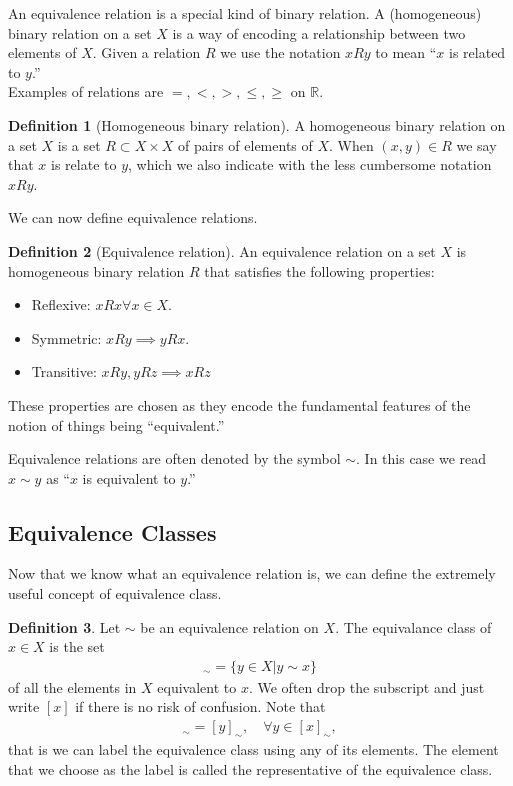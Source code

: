 \documentclass{book}
\theoremstyle{definition}
\newtheorem{defn}{Definition}[section]
\begin{document}
An equivalence relation is a special kind of binary relation. A
(homogeneous) binary relation on a set $X$ is a way of encoding a relationship between two elements of $X$. Given a relation $R$ we use the notation $xRy$ to mean ``$x$ is related to $y$.'' \\

Examples of relations are $=,<,>, \leq, \geq$ on $\mathbb{R}$. \\

\begin{defn}[Homogeneous binary relation]
	A homogeneous binary relation on a set $X$ is a set $R \subset X \times X$ of pairs of
	elements of $X$. When $(x,y) \in R$ we say that $x$ is relate to $y$, which we also indicate with the less cumbersome notation $xRy$.  
\end{defn}

We can now define equivalence relations.



\begin{defn}[Equivalence relation]
	An equivalence relation on a set $X$ is homogeneous binary relation $R$ that satisfies the following properties:
	\begin{itemize}
		\item Reflexive: $xRx \forall x\in X$.
		\item Symmetric: $xRy \implies yRx$.
		\item Transitive: $xRy, yRz \implies xRz$
	\end{itemize}
	These properties are chosen as they encode the fundamental features of the notion of
	things being ``equivalent.''
\end{defn}

Equivalence relations are often denoted by the symbol $\sim$. In this case we read $x\sim y$ as ``$x$ is equivalent to $y$.'' 





\subsection{Equivalence Classes}

Now that we know what an equivalence relation is, we can define the extremely useful concept of equivalence class.


\begin{defn}
	Let $\sim$ be an equivalence relation on $X$. The equivalance class of $x \in X$ is the set 
	\begin{align}
	[x]_\sim = \{ y\in X \vert y\sim x   \}
	\end{align}
	of all the elements in $X$ equivalent to $x$. We often drop the subscript and just write $[x]$ if there is no risk of confusion. Note that
	\begin{align}
	[x]_\sim = [y]_\sim, \quad \forall y \in [x]_\sim,
	\end{align}
	that is we can label the equivalence class using any of its elements. The element that we
	choose as the label is called the representative of the equivalence class.
\end{defn}
\end{document}
